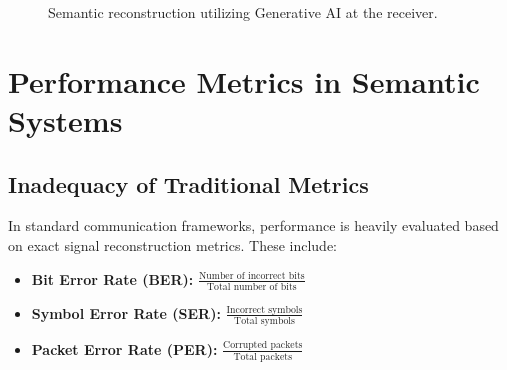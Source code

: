 \documentclass[10pt, conference]{IEEEtran}
\begin{document}
\begin{figure}[h]
\centering


\caption{Semantic reconstruction utilizing Generative AI at the receiver.}
\label{fig:gen_ai_reconstruction}

\end{figure}

\section{\large \textbf{Performance Metrics in Semantic Systems}}

\subsection{\textbf{Inadequacy of Traditional Metrics}}
In standard communication frameworks, performance is heavily evaluated based on exact signal reconstruction metrics. These include:
\begin{itemize}
    \item \textbf{Bit Error Rate (BER):} $\frac{\text{Number of incorrect bits}}{\text{Total number of bits}}$
    \item \textbf{Symbol Error Rate (SER):} $\frac{\text{Incorrect symbols}}{\text{Total symbols}}$
    \item \textbf{Packet Error Rate (PER):} $\frac{\text{Corrupted packets}}{\text{Total packets}}$
\end{itemize}
\end{document}
